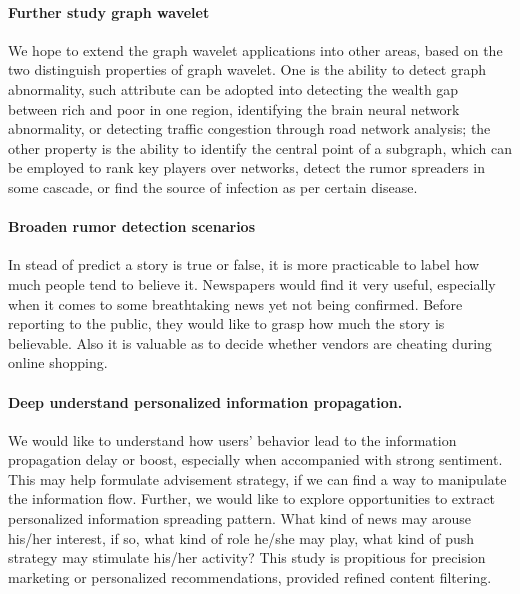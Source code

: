 \paragraph{Further study graph wavelet}
We hope to extend the graph wavelet applications into other areas, based on the two distinguish properties of graph wavelet. One is the ability to detect graph abnormality, such attribute can be adopted into detecting the wealth gap between rich and poor in one region, identifying the brain neural network abnormality, or detecting traffic congestion through road network analysis; the other property is the ability to identify the central point of a subgraph, which can be employed to rank key players over networks, detect the rumor spreaders in some cascade, or find the source of infection as per certain disease.

\paragraph{Broaden rumor detection scenarios}
In stead of predict a story is true or false, it is more practicable to label how much people tend to believe it. Newspapers would find it very useful, especially when it comes to some breathtaking news yet not being confirmed. Before reporting to the public, they would like to grasp how much the story is believable. Also it is valuable as to decide whether vendors are cheating during online shopping.


\paragraph{Deep understand personalized information propagation.}
We would like to understand how users' behavior lead to the information propagation delay or boost, especially when accompanied with strong sentiment. This may help formulate advisement strategy, if we can find a way to manipulate the information flow. Further, we would like to explore opportunities to extract personalized information spreading pattern. What kind of news may arouse his/her interest, if so, what kind of role he/she may play, what kind of push strategy may stimulate his/her activity? This study is propitious for precision marketing or personalized recommendations, provided refined content filtering.

